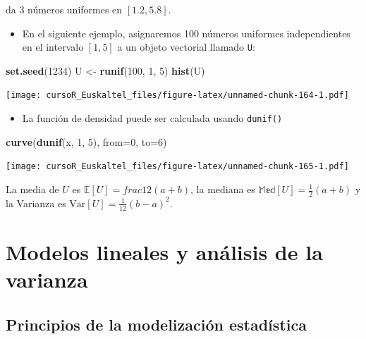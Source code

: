 \documentclass[]{book}
\newenvironment{Shaded}{\begin{snugshade}}{\end{snugshade}}
\newcommand{\KeywordTok}[1]{\textcolor[rgb]{0.13,0.29,0.53}{\textbf{#1}}}
\newcommand{\DataTypeTok}[1]{\textcolor[rgb]{0.13,0.29,0.53}{#1}}
\newcommand{\DecValTok}[1]{\textcolor[rgb]{0.00,0.00,0.81}{#1}}
\newcommand{\StringTok}[1]{\textcolor[rgb]{0.31,0.60,0.02}{#1}}
\newcommand{\NormalTok}[1]{#1}
\providecommand{\tightlist}{%
  \setlength{\itemsep}{0pt}\setlength{\parskip}{0pt}}
\begin{document}
da 3 números uniformes en \([1.2,5.8]\).

\begin{itemize}
\tightlist
\item
  En el siguiente ejemplo, asignaremos 100 números uniformes
  independientes en el intervalo \([1,5]\) a un objeto vectorial llamado
  \texttt{U}:
\end{itemize}

\begin{Shaded}
\begin{Highlighting}[]
\KeywordTok{set.seed}\NormalTok{(}\DecValTok{1234}\NormalTok{)}
\NormalTok{U <-}\StringTok{ }\KeywordTok{runif}\NormalTok{(}\DecValTok{100}\NormalTok{, }\DecValTok{1}\NormalTok{, }\DecValTok{5}\NormalTok{)}
\KeywordTok{hist}\NormalTok{(U)}
\end{Highlighting}
\end{Shaded}

\texttt{[image: cursoR\_Euskaltel\_files/figure-latex/unnamed-chunk-164-1.pdf]}

\begin{itemize}
\tightlist
\item
  La función de densidad puede ser calculada usando \texttt{dunif()}
\end{itemize}

\begin{Shaded}
\begin{Highlighting}[]
\KeywordTok{curve}\NormalTok{(}\KeywordTok{dunif}\NormalTok{(x, }\DecValTok{1}\NormalTok{, }\DecValTok{5}\NormalTok{), }\DataTypeTok{from=}\DecValTok{0}\NormalTok{, }\DataTypeTok{to=}\DecValTok{6}\NormalTok{)}
\end{Highlighting}
\end{Shaded}

\texttt{[image: cursoR\_Euskaltel\_files/figure-latex/unnamed-chunk-165-1.pdf]}

La media de \(U\) es \(\mathbb{E}[U]=frac{1}{2}(a+b)\), la mediana es
\(\mathbb{Med}[U]=\frac{1}{2}(a+b)\) y la Varianza es
\(\mbox{Var}[U]=\frac{1}{12}(b-a)^2\).

\chapter{Modelos lineales y análisis de la
varianza}\label{modelos-lineales-y-analisis-de-la-varianza}

\section{Principios de la modelización
estadística}\label{principios-de-la-modelizacion-estadistica}
\end{document}
